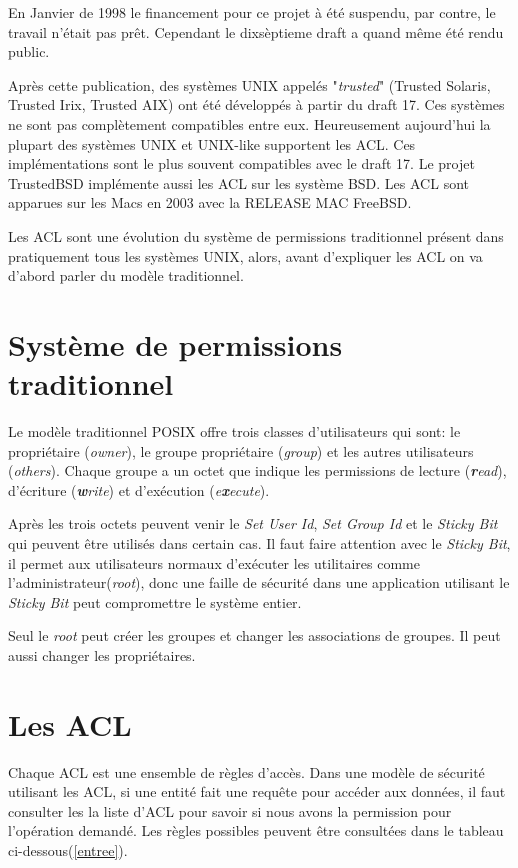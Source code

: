\documentclass{article}
\begin{document}
En Janvier de 1998\cite{aclsuse} le financement pour ce projet à été suspendu, par contre, le travail n'était pas prêt. Cependant le dixsèptieme draft a quand même été rendu public\cite{posix17}.
 
Après cette publication, des systèmes UNIX appelés "\emph{trusted}" (Trusted Solaris, Trusted Irix, Trusted AIX) ont été développés à partir du draft 17. Ces systèmes ne sont pas complètement compatibles entre eux. Heureusement aujourd'hui la plupart des systèmes UNIX et UNIX-like supportent les ACL. Ces implémentations sont le plus souvent compatibles avec le draft 17. Le projet TrustedBSD implémente aussi les ACL sur les système BSD. Les ACL sont apparues sur les Macs en 2003 avec la RELEASE MAC FreeBSD.
 
Les ACL sont une évolution du système de permissions traditionnel présent dans pratiquement tous les systèmes UNIX, alors, avant d'expliquer les ACL on va d'abord parler du modèle traditionnel.

\section{Système de permissions traditionnel}
 
Le modèle traditionnel POSIX offre trois classes d'utilisateurs qui sont: le propriétaire (\emph{owner}), le groupe propriétaire (\emph{group}) et les autres utilisateurs (\emph{others}). Chaque groupe a un octet que indique les permissions de lecture (\emph{\textbf{r}ead}), d'écriture (\emph{\textbf{w}rite}) et d'exécution (\emph{e\textbf{x}ecute}).
 
Après les trois octets peuvent venir le \emph{Set User Id}, \emph{Set Group Id} et le \emph{Sticky Bit} qui peuvent être utilisés dans certain cas. Il faut faire attention avec le \emph{Sticky Bit}, il permet aux utilisateurs normaux d'exécuter les utilitaires comme l'administrateur(\emph{root}), donc une faille de sécurité dans une application utilisant le \emph{Sticky Bit} peut compromettre le système entier.
 
Seul le \emph{root} peut créer les groupes et changer les associations de groupes. Il peut aussi changer les propriétaires.
 
\section{Les ACL}
 
Chaque ACL est une ensemble de règles d'accès. Dans une modèle de sécurité utilisant les ACL, si une entité fait une requête pour accéder aux données, il faut consulter les la liste d'ACL pour savoir si nous avons la permission pour l'opération demandé. Les règles possibles peuvent être consultées dans le tableau ci-dessous(\ref{entree}).
\end{document}
